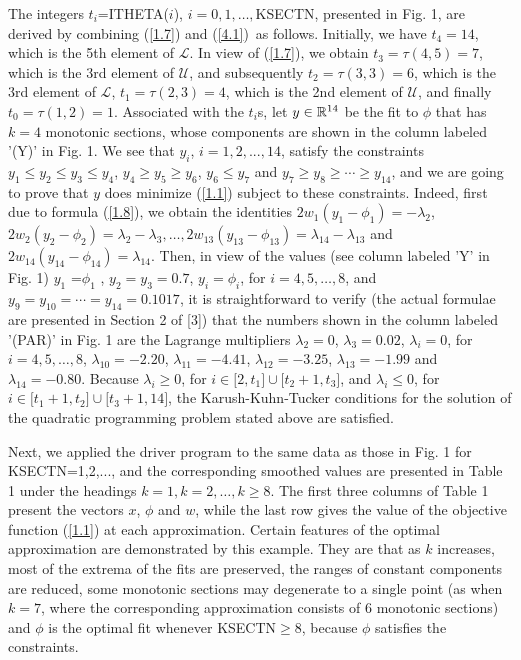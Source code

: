 \documentclass[acmtoms]{acmtrans2m}
\begin{document}
The integers $t_{i}$=ITHETA($i$), $i=0,1,\ldots ,$KSECTN, presented in Fig.
1, are derived by combining (\ref{1.7}) and (\ref{4.1})\ as follows.
Initially, we have $t_{4}=14$, which is the 5th element of $\mathscr{L}$. In
view of (\ref{1.7}), we obtain $t_{3}=\tau (4,5)=7$, which is the 3rd
element of $\mathscr{U}$, and subsequently $t_{2}=\tau (3,3)=6$, which is
the 3rd element of $\mathscr{L}$, $t_{1}=\tau (2,3)=4$, which is the 2nd
element of $\mathscr{U}$, and finally $t_{0}=\tau (1,2)=1$. Associated with
the $t_{i}$s, let $y\in \Bbb{R}^{14}$ be the fit to $\phi $ that has $k=4$
monotonic sections, whose components are shown in the column labeled '(Y)'
in Fig. 1. We see that $y_{i}$, $i=1,2,...,14$, satisfy the constraints $%
y_{1}\leq y_{2}\leq y_{3}\leq y_{4}$, $y_{4}\geq y_{5}\geq y_{6}$, $%
y_{6}\leq y_{7}$ and $y_{7}\geq y_{8}\geq \cdots \geq y_{14}$, and we are
going to prove that $y$ does minimize (\ref{1.1}) subject to these
constraints. Indeed, first due to formula (\ref{1.8}), we obtain the
identities $2w_{1}(y_{1}-\phi _{1})=-\lambda _{2}$, $2w_{2}(y_{2}-\phi
_{2})=\lambda _{2}-\lambda _{3},\ldots ,2w_{13}(y_{13}-\phi _{13})=\lambda
_{14}-\lambda _{13}$ and $2w_{14}(y_{14}-\phi _{14})=\lambda _{14}$. Then,
in view of the values (see column labeled 'Y' in Fig. 1) $y_{1}$ =$\phi _{1}$%
, $y_{2}=y_{3}=0.7$, $y_{i}=\phi _{i}$, for $i=4,5,\ldots ,8$, and $%
y_{9}=y_{10}=\cdots =y_{14}=0.1017$, it is straightforward to verify (the
actual formulae are presented in Section 2 of [3]) that the numbers shown in
the column labeled '(PAR)' in Fig. 1 are the Lagrange multipliers $\lambda
_{2}=0$, $\lambda _{3}=0.02$, $\lambda _{i}=0$, for $i=4,5,\ldots ,8$, $%
\lambda _{10}=-2.20$, $\lambda _{11}=-4.41$, $\lambda _{12}=-3.25$, $\lambda
_{13}=-1.99$ and $\lambda _{14}=-0.80$. Because $\lambda _{i}\geq 0$, for $%
i\in \lbrack 2,t_{1}]\cup \lbrack t_{2}+1,t_{3}]$, and $\lambda _{i}\leq 0$,
for $i\in \lbrack t_{1}+1,t_{2}]\cup \lbrack t_{3}+1,14]$, the
Karush-Kuhn-Tucker conditions for the solution of the quadratic programming
problem stated above are satisfied.

Next, we applied the driver program to the same data as those in Fig. 1 for
KSECTN=1,2,..., and the corresponding smoothed values are presented in Table
1 under the headings $k=1,k=2,\ldots ,k\geq 8$. The first three columns of
Table 1 present the vectors $x$, $\phi $ and $w$, while the last row gives
the value of the objective function (\ref{1.1}) at each approximation.
Certain features of the optimal approximation are demonstrated by this
example. They are that as $k$ increases, most of the extrema of the fits are
preserved, the ranges of constant components are reduced, some monotonic
sections may degenerate to a single point (as when $k=7$, where the
corresponding approximation consists of 6 monotonic sections) and $\phi $ is
the optimal fit whenever KSECTN$\geq $8, because $\phi $ satisfies the
constraints.
\end{document}

